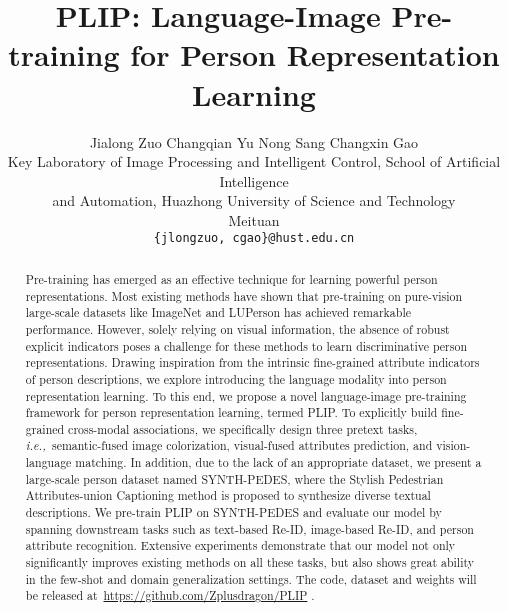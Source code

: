 \documentclass[10pt,twocolumn,letterpaper]{article}
\def\ie{{\it{i.e.,~}}}
\begin{document}
\title{PLIP: Language-Image Pre-training for Person Representation Learning}

\author{Jialong Zuo\quad
		 Changqian Yu\quad
		Nong Sang\quad
		Changxin Gao\quad \\
Key Laboratory of Image Processing and Intelligent Control, School of Artificial Intelligence\\ and Automation, Huazhong University of Science and Technology 
        \\ Meituan  \\
		{\tt\small \{jlongzuo, cgao\}@hust.edu.cn} \quad 
	}

\maketitle
\ifarxivfinal\thispagestyle{empty}\fi


\begin{abstract}
  Pre-training has emerged as an effective technique for learning powerful person representations. Most existing methods have shown that pre-training on pure-vision large-scale datasets like ImageNet and LUPerson has achieved remarkable performance. However, solely relying on visual information, the absence of robust explicit indicators poses a challenge for these methods to learn discriminative person representations. Drawing inspiration from the intrinsic fine-grained attribute indicators of person descriptions, we explore introducing the language modality into person representation learning. To this end, we propose a novel language-image pre-training framework for person representation learning, termed PLIP. To explicitly build fine-grained cross-modal associations, we specifically design three pretext tasks, \ie semantic-fused image colorization, visual-fused attributes prediction, and vision-language matching. In addition, due to the lack of an appropriate dataset, we present a large-scale person dataset named SYNTH-PEDES, where the Stylish Pedestrian Attributes-union Captioning method is proposed to synthesize diverse textual descriptions. We pre-train PLIP on SYNTH-PEDES and evaluate our model by spanning downstream tasks such as text-based Re-ID, image-based Re-ID, and person attribute recognition. Extensive experiments demonstrate that our model not only significantly improves existing methods on all these tasks, but also shows great ability in the few-shot and domain generalization settings. The code, dataset and weights will be released at~\url{https://github.com/Zplusdragon/PLIP} .
\end{abstract}
\end{document}
